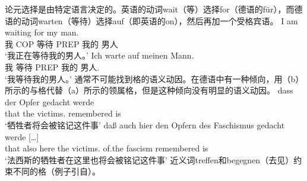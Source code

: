 \begin{exe}
\begin{xlist}[iv.]
\begin{exe}
\begin{xlist}[iv.]
论元选择是由特定语言决定的。英语的动词wait（等）选择for（德语的für），而德语的动词warten（等待）选择auf（即英语的on），然后再加一个受格宾语。
\eal \label{loureed}
\ex 
\gll I am waiting for my man.\\
     我 COP 等待 PREP 我的 男人\\
\glt `我正在等待我的男人。'
\ex 
\gll Ich warte auf meinen Mann.\\
     我   等待  PREP  我的     男人.\acc\\
\glt `我等待我的男人。'
\zl
通常不可能找到格的语义动因。在德语中有一种倾向，用（b）所示的与格代替（a）所示的领属格，但是这种倾向没有明显的语义动因。
\eal
\ex 
\gll dass der Opfer gedacht werde\\
     that the victims.\gen{} remembered is\\
\glt `牺牲者将会被铭记这件事'
\ex 
\gll daß auch hier den Opfern des Faschismus gedacht werde [\ldots]\footnotemark\\
     that also here the victims.\dat{} of.the fascism remembered is\\
\glt `法西斯的牺牲者在这里也将会被铭记这件事'
\zl
近义词treffen和begegnen（去见）约束不同的格（例子引自\citet[]{ps}）。

\end{xlist}
\end{exe}
\end{xlist}
\end{exe}
